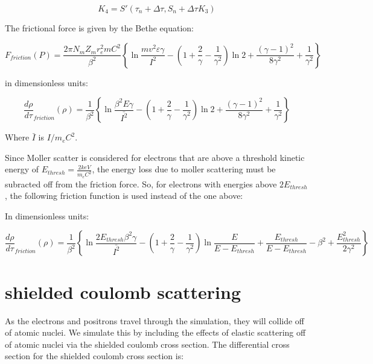 \documentclass[]{article}
\begin{document}
\begin{equation} 
K_4=S'(\tau_n + \Delta\tau, S_n + \Delta\tau K_3)
\end{equation}


The frictional force is given by the Bethe equation:

\begin{equation} 
F_{friction}(P)  =\frac{ 2 \pi N_m Z_m r_e^2 m C^2}{\beta^2} \left\lbrace  \ln\frac{mv^2\varepsilon\gamma}{I^2}
-\left( 1 + \frac{2}{\gamma}  - \frac{1}{\gamma^2} \right)\ln 2 + \frac{(\gamma-1)^2}{8\gamma^2}  + \frac{1}{\gamma^2} \right\rbrace 
\end{equation}

in dimensionless units:

\begin{equation} 
\frac{d \rho}{d \tau}_{friction}(\rho)  =\frac{ 1 }{\beta^2} \left\lbrace  \ln\frac{\beta^2E\gamma}{\bar{I^2}}
-\left( 1 + \frac{2}{\gamma}  - \frac{1}{\gamma^2} \right)\ln 2 + \frac{(\gamma-1)^2}{8\gamma^2}  + \frac{1}{\gamma^2} \right\rbrace 
\end{equation}

Where $\bar{I}$ is $I/m_eC^2$.

Since Moller scatter is considered for electrons that are above a  threshold kinetic energy of $E_{thresh}= \frac{2 keV}{m_e C^2}$, the energy loss due to moller scattering must be subracted off from the friction force. So, for electrons with energies above $2E_{thresh}$, the following friction function is used instead of the one above:

In dimensionless units:

\begin{equation} 
\frac{d \rho}{d \tau}_{friction}(\rho)  =\frac{ 1 }{\beta^2} \left\lbrace  \ln\frac{2E_{thresh} \beta^2 \gamma}{\bar{I^2}}
-\left( 1 + \frac{2}{\gamma}  - \frac{1}{\gamma^2} \right)\ln \frac{ E }{E- E_{thresh}} + \frac{E_{thresh}}{E-E_{thresh}} - \beta^2 + \frac{E_{thresh}^2}{2\gamma^2} \right\rbrace 
\end{equation}


\section{shielded coulomb scattering}

As the electrons and positrons travel through the simulation, they will collide off of atomic nuclei. We simulate this by including the effects of elastic scattering off of atomic nuclei via the shielded coulomb cross section.  The differential cross section for the shielded coulomb cross section is:
\end{document}
